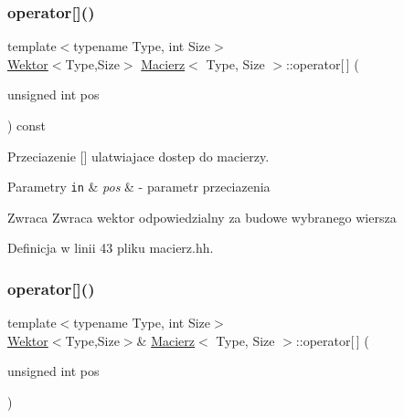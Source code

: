 \subsubsection{\texorpdfstring{operator[]()}{operator[]()}\hspace{0.1cm}{\footnotesize\ttfamily [1/2]}}
{\footnotesize\ttfamily template$<$typename Type, int Size$>$ \\
\hyperlink{class_wektor}{Wektor}$<$Type,Size$>$ \hyperlink{class_macierz}{Macierz}$<$ Type, Size $>$\+::operator\mbox{[}$\,$\mbox{]} (\begin{DoxyParamCaption}\item[{unsigned int}]{pos }\end{DoxyParamCaption}) const\hspace{0.3cm}{\ttfamily [inline]}}



Przeciazenie \mbox{[}\mbox{]} ulatwiajace dostep do macierzy. 


\begin{DoxyParams}[1]{Parametry}
\mbox{\tt in}  & {\em pos} & -\/ parametr przeciazenia \\
\hline
\end{DoxyParams}
\begin{DoxyReturn}{Zwraca}
Zwraca wektor odpowiedzialny za budowe wybranego wiersza 
\end{DoxyReturn}


Definicja w linii 43 pliku macierz.\+hh.

\mbox{\label{class_macierz_adc2e2b93aa5b4079a756142e4d8402d1}} 
\subsubsection{\texorpdfstring{operator[]()}{operator[]()}\hspace{0.1cm}{\footnotesize\ttfamily [2/2]}}
{\footnotesize\ttfamily template$<$typename Type, int Size$>$ \\
\hyperlink{class_wektor}{Wektor}$<$Type,Size$>$\& \hyperlink{class_macierz}{Macierz}$<$ Type, Size $>$\+::operator\mbox{[}$\,$\mbox{]} (\begin{DoxyParamCaption}\item[{unsigned int}]{pos }\end{DoxyParamCaption})\hspace{0.3cm}{\ttfamily [inline]}}



